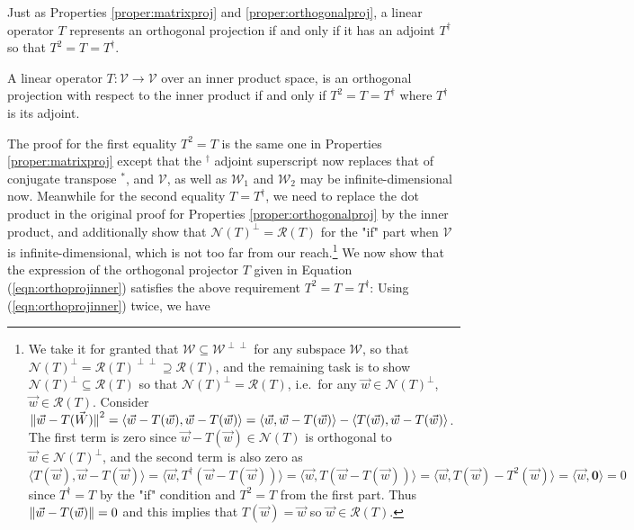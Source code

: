Just as Properties \ref{proper:matrixproj} and \ref{proper:orthogonalproj}, a linear operator $T$ represents an orthogonal projection if and only if it has an adjoint $T^\dag$ so that $T^2 = T = T^\dag$.
\begin{proper}
\label{proper:orthoprojadjoint}
A linear operator $T: \mathcal{V} \to \mathcal{V}$ over an inner product space, is an orthogonal projection with respect to the inner product if and only if $T^2 = T = T^\dag$ where $T^\dag$ is its adjoint.
\end{proper}
The proof for the first equality $T^2 = T$ is the same one in Properties \ref{proper:matrixproj} except that the $^\dag$ adjoint superscript now replaces that of conjugate transpose $^*$, and $\mathcal{V}$, as well as $\mathcal{W}_1$ and $\mathcal{W}_2$ may be infinite-dimensional now. Meanwhile for the second equality $T = T^\dag$, we need to replace the dot product in the original proof for Properties \ref{proper:orthogonalproj} by the inner product, and additionally show that $\mathcal{N}(T)^\perp = \mathcal{R}(T)$ for the "if" part when $\mathcal{V}$ is infinite-dimensional, which is not too far from our reach.\footnote{We take it for granted that $\mathcal{W} \subseteq \mathcal{W}^{\perp\perp}$ for any subspace $\mathcal{W}$, so that $\mathcal{N}(T)^\perp = \mathcal{R}(T)^{\perp\perp} \supseteq \mathcal{R}(T)$, and the remaining task is to show $\mathcal{N}(T)^\perp \subseteq \mathcal{R}(T)$ so that $\mathcal{N}(T)^\perp = \mathcal{R}(T)$, i.e.\ for any $\vec{w} \in \mathcal{N}(T)^\perp$, $\vec{w} \in \mathcal{R}(T)$. Consider $\norm{\smash{\vec{w} - T(\vec{W})}}^2 = \langle \vec{w} - T(\vec{w}), \vec{w} - T(\vec{w}) \rangle = \langle \vec{w}, \vec{w} - T(\vec{w}) \rangle - \langle T(\vec{w}), \vec{w} - T(\vec{w}) \rangle$. The first term is zero since $\vec{w} - T(\vec{w}) \in \mathcal{N}(T)$ is orthogonal to $\vec{w} \in \mathcal{N}(T)^\perp$, and the second term is also zero as $\langle T(\vec{w}), \vec{w} - T(\vec{w}) \rangle = \langle \vec{w}, T^\dag(\vec{w} - T(\vec{w})) \rangle = \langle \vec{w}, T(\vec{w} - T(\vec{w})) \rangle = \langle \vec{w}, T(\vec{w}) - T^2(\vec{w}) \rangle = \langle \vec{w}, \textbf{0} \rangle = 0$ since $T^\dag = T$ by the "if" condition and $T^2 = T$ from the first part. Thus $\norm{\vec{w} - T(\vec{w})} = 0$ and this implies that $T(\vec{w}) = \vec{w}$ so $\vec{w} \in \mathcal{R}(T)$.} We now show that the expression of the orthogonal projector $T$ given in Equation (\ref{eqn:orthoprojinner}) satisfies the above requirement $T^2 = T = T^\dag$: Using (\ref{eqn:orthoprojinner}) twice, we have
